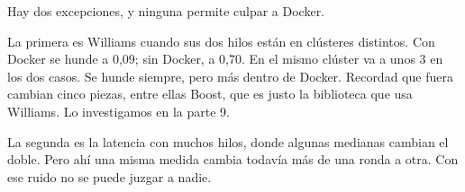 Hay dos excepciones, y ninguna permite culpar a Docker.

La primera es Williams cuando sus dos hilos están en clústeres distintos. Con Docker se hunde a 0,09; sin Docker, a 0,70. En el mismo clúster va a unos 3 en los dos casos. Se hunde siempre, pero más dentro de Docker. Recordad que fuera cambian cinco piezas, entre ellas Boost, que es justo la biblioteca que usa Williams. Lo investigamos en la parte 9.

La segunda es la latencia con muchos hilos, donde algunas medianas cambian el doble. Pero ahí una misma medida cambia todavía más de una ronda a otra. Con ese ruido no se puede juzgar a nadie.
